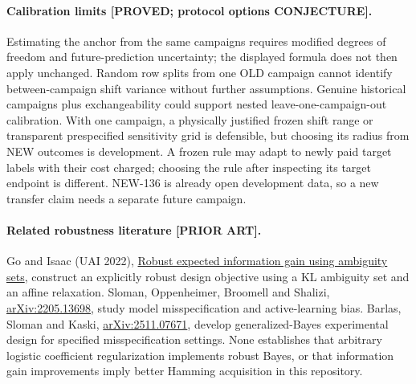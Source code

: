 \paragraph{Calibration limits [PROVED; protocol options CONJECTURE].}
Estimating the anchor from the same campaigns requires modified degrees
of freedom and future-prediction uncertainty; the displayed formula
does not then apply unchanged.  Random row splits from one OLD campaign
cannot identify between-campaign shift variance without further
assumptions.  Genuine historical campaigns plus exchangeability could
support nested leave-one-campaign-out calibration.  With one campaign,
a physically justified frozen shift range or transparent prespecified
sensitivity grid is defensible, but choosing its radius from NEW outcomes
is development.  A frozen rule may adapt to newly paid target labels
with their cost charged; choosing the rule after inspecting its target
endpoint is different.  NEW-136 is already open development data, so a
new transfer claim needs a separate future campaign.

\paragraph{Related robustness literature [PRIOR ART].}
Go and Isaac (UAI 2022),
\href{https://proceedings.mlr.press/v180/go22a.html}{Robust expected information gain using ambiguity sets},
construct an explicitly robust design objective using a KL ambiguity set
and an affine relaxation.  Sloman, Oppenheimer, Broomell and Shalizi,
\href{https://arxiv.org/abs/2205.13698}{arXiv:2205.13698},
study model misspecification and active-learning bias.  Barlas, Sloman
and Kaski,
\href{https://arxiv.org/abs/2511.07671}{arXiv:2511.07671},
develop generalized-Bayes experimental design for specified
misspecification settings.  None establishes that arbitrary logistic
coefficient regularization implements robust Bayes, or that information
gain improvements imply better Hamming acquisition in this repository.

